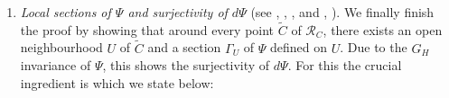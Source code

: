 \documentclass[11pt,twoside]{amsart}
\theoremstyle{plain}
\theoremstyle{definition}
\newcommand{\PP}{\mathbb{P}}
\newcommand{\PM}{\mathbb{P}^M}
\newcommand{\OO}{\mathcal{O}}
\newcommand{\Ext}{\operatorname{Ext}}
\newcommand{\id}{\mathrm{id}}
\newcommand{\Ct}{\widetilde{C}}
\newcommand{\SC}{\mathcal{S}_C}
\newcommand{\RC}{\mathcal{R}_C}
\newcommand{\GH}{G_H}
\begin{document}
\begin{enumerate}
    \item[(4)] \emph{Local sections of $\Psi$ and surjectivity of $d\Psi$} (see , , ,  and , ). 
    We finally finish the proof by showing that around every point $\widetilde{C}$ of $\mathcal{R}_C$, there exists an open neighbourhood $U$ of $\widetilde C$ and a section $\Gamma_U$ of $\Psi$ defined on $U$. Due to the $G_H$ invariance of $\Psi$, this shows the surjectivity of $d\Psi$. For this the crucial ingredient is  which we state below:


\end{enumerate}
\end{document}
